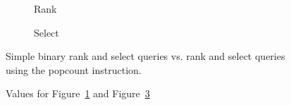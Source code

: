 \begin{figure}\tiny
	\begin{subfigure}{0.48\textwidth}
		
		\caption{Rank}
		\label{fig:rankPopcountDiff}
	\end{subfigure}
	\hfill
	\begin{subfigure}{0.48\textwidth}
		
		\caption{Select}
		\label{fig:selectPopcountDiff}
	\end{subfigure}
	\caption{Simple binary rank and select queries vs. rank and select queries using the popcount instruction.}
\end{figure}
\begin{figure}
\center
	\caption{Values for Figure~\ref{fig:rankPopcountDiff} and Figure~\ref{fig:selectPopcountDiff}}
	\label{fig:valuesForPopcountDiff}
	
\end{figure}

\restoregeometry




